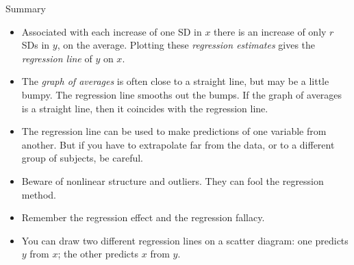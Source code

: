 \documentclass[
  ignorenonframetext,
]{beamer}
\providecommand{\tightlist}{%
  \setlength{\itemsep}{0pt}\setlength{\parskip}{0pt}}
\begin{document}
\begin{frame}{Summary}
\protect\hypertarget{summary}{}
\begin{itemize}
\tightlist
\item
  Associated with each increase of one SD in \(x\) there is an increase
  of only \(r\) SDs in \(y\), on the average. Plotting these
  \textit{regression
  estimates} gives the \textit{regression line} of \(y\) on \(x\).
\item
  The \textit{graph of averages} is often close to a straight line, but
  may be a little bumpy. The regression line smooths out the bumps. If
  the graph of averages is a straight line, then it coincides with the
  regression line.
\item
  The regression line can be used to make predictions of one variable
  from another. But if you have to extrapolate far from the data, or to
  a different group of subjects, be careful.
\item
  Beware of nonlinear structure and outliers. They can fool the
  regression method.
\item
  Remember the regression effect and the regression fallacy.
\item
  You can draw two different regression lines on a scatter diagram: one
  predicts \(y\) from \(x\); the other predicts \(x\) from \(y\).
\end{itemize}
\end{frame}
\end{document}

